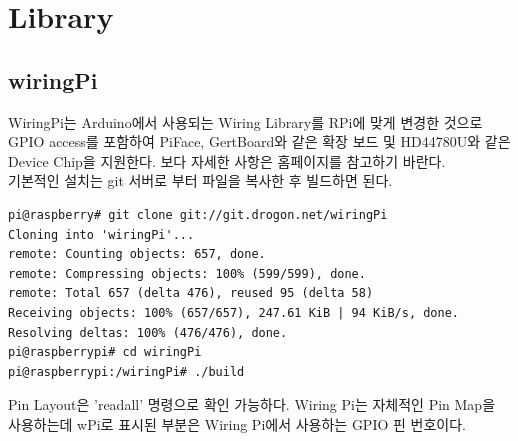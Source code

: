 \documentclass[11pt
  , a4paper
  , article
  , oneside
]{memoir}
\begin{document}
\section{Library}
\subsection{wiringPi}
WiringPi는 Arduino에서 사용되는 Wiring Library를 RPi에 맞게 변경한 것으로 GPIO access를 포함하여 
PiFace, GertBoard와 같은 확장 보드 및 HD44780U와 같은 Device Chip을 지원한다. 보다 자세한 사항은
홈페이지\cite{WIRINGPI}를 참고하기 바란다.\\
기본적인 설치는 git 서버로 부터 파일을 복사한 후 빌드하면 된다.
\begin{lstlisting}[style=termstyle]
pi@raspberry# git clone git://git.drogon.net/wiringPi
Cloning into 'wiringPi'...
remote: Counting objects: 657, done.
remote: Compressing objects: 100% (599/599), done.
remote: Total 657 (delta 476), reused 95 (delta 58)
Receiving objects: 100% (657/657), 247.61 KiB | 94 KiB/s, done.
Resolving deltas: 100% (476/476), done.
pi@raspberrypi# cd wiringPi
pi@raspberrypi:/wiringPi# ./build
\end{lstlisting}
Pin Layout은 'readall' 명령으로 확인 가능하다. Wiring Pi는 자체적인 Pin Map을 사용하는데 wPi로 
표시된 부분은 Wiring Pi에서 사용하는 GPIO 핀 번호이다.
\end{document}
